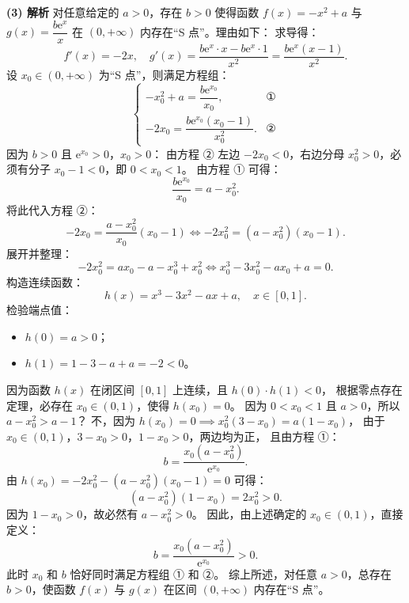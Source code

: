 \begin{answer}
\textbf{(3) 解析}
对任意给定的 $a > 0$，存在 $b > 0$ 使得函数 $f(x) = -x^2 + a$ 与 $g(x) = \dfrac{b\mathrm{e}^x}{x}$ 在 $(0, +\infty)$ 内存在“S 点”。理由如下：
求导得：
\nopagebreak[4]
\[f'(x) = -2x, \quad g'(x) = \frac{b\mathrm{e}^x \cdot x - b\mathrm{e}^x \cdot 1}{x^2} = \frac{b\mathrm{e}^x(x - 1)}{x^2}.\]
设 $x_0 \in (0, +\infty)$ 为“S 点”，则满足方程组：
\nopagebreak[4]
\[\begin{cases} -x_0^2 + a = \dfrac{b\mathrm{e}^{x_0}}{x_0}, & \text{①} \\ -2x_0 = \dfrac{b\mathrm{e}^{x_0}(x_0 - 1)}{x_0^2}. & \text{②} \end{cases}\]
因为 $b > 0$ 且 $\mathrm{e}^{x_0} > 0$，$x_0 > 0$：
由方程 ② 左边 $-2x_0 < 0$，右边分母 $x_0^2 > 0$，必须有分子 $x_0 - 1 < 0$，即 $0 < x_0 < 1$。
由方程 ① 可得：
\nopagebreak[4]
\[\frac{b\mathrm{e}^{x_0}}{x_0} = a - x_0^2.\]
将此代入方程 ②：
\nopagebreak[4]
\[-2x_0 = \frac{a - x_0^2}{x_0} (x_0 - 1) \iff -2x_0^2 = (a - x_0^2)(x_0 - 1).\]
展开并整理：
\nopagebreak[4]
\[-2x_0^2 = ax_0 - a - x_0^3 + x_0^2 \iff x_0^3 - 3x_0^2 - ax_0 + a = 0.\]
构造连续函数：
\nopagebreak[4]
\[h(x) = x^3 - 3x^2 - ax + a, \quad x \in [0, 1].\]
检验端点值：
\begin{itemize}
\item $h(0) = a > 0$；
\item $h(1) = 1 - 3 - a + a = -2 < 0$。
\end{itemize}
因为函数 $h(x)$ 在闭区间 $[0, 1]$ 上连续，且 $h(0) \cdot h(1) < 0$，
根据零点存在定理，必存在 $x_0 \in (0, 1)$，使得 $h(x_0) = 0$。
因为 $0 < x_0 < 1$ 且 $a > 0$，所以 $a - x_0^2 > a - 1$？
不，因为 $h(x_0) = 0 \implies x_0^2(3 - x_0) = a(1 - x_0)$，
由于 $x_0 \in (0, 1)$，$3 - x_0 > 0$，$1 - x_0 > 0$，两边均为正，
且由方程 ①：
\nopagebreak[4]
\[b = \frac{x_0(a - x_0^2)}{\mathrm{e}^{x_0}}.\]
由 $h(x_0) = -2x_0^2 - (a - x_0^2)(x_0 - 1) = 0$ 可得：
\nopagebreak[4]
\[(a - x_0^2)(1 - x_0) = 2x_0^2 > 0.\]
因为 $1 - x_0 > 0$，故必然有 $a - x_0^2 > 0$。
因此，由上述确定的 $x_0 \in (0, 1)$，直接定义：
\nopagebreak[4]
\[b = \frac{x_0(a - x_0^2)}{\mathrm{e}^{x_0}} > 0.\]
此时 $x_0$ 和 $b$ 恰好同时满足方程组 ① 和 ②。
综上所述，对任意 $a > 0$，总存在 $b > 0$，使函数 $f(x)$ 与 $g(x)$ 在区间 $(0, +\infty)$ 内存在“S 点”。




\end{answer}
